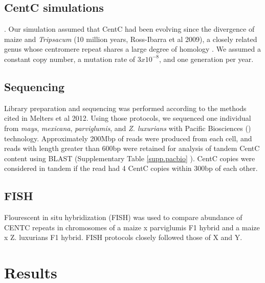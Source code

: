 \subsection*{CentC simulations}

. Our simulation assumed that CentC had been evolving since the divergence of maize and \emph{Tripsacum} (10 million years, Ross-Ibarra et al 2009), a closely related genus whose centromere repeat shares a large degree of homology \citep{Melters2012}.  We assumed a constant copy number, a mutation rate of $3 x 10^{-8}$, and one generation per year.  

\subsection*{Sequencing}
	
Library preparation and sequencing was performed according to the methods cited in Melters et al 2012.  Using those protocols, we sequenced one individual from \emph{mays}, \emph{mexicana}, \emph{parviglumis}, and \emph{Z. luxurians} with Pacific Biosciences () technology. Approximately 200Mbp of reads were produced from each cell, and reads with length greater than 600bp were retained for analysis of tandem CentC content using BLAST (Supplementary Table \ref{supp.pacbio} ).  CentC copies were considered in tandem if the read had 4 CentC copies within 300bp of each other. 

\subsection*{FISH}

Flourescent in situ hybridization (FISH) was used to compare abundance of CENTC repeats in chromosomes of a maize x parviglumis F1 hybrid and a maize x Z. luxurians F1 hybrid. FISH protocols closely followed those of X and Y.

\section*{Results}
\label{results}

